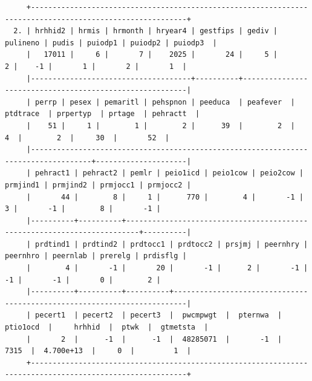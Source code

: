 \documentclass[
]{book}
\begin{document}
\begin{verbatim}
     +----------------------------------------------------------------------------------------------------------+
  2. | hrhhid2 | hrmis | hrmonth | hryear4 | gestfips | gediv | pulineno | pudis | puiodp1 | puiodp2 | puiodp3  |
     |   17011 |     6 |       7 |    2025 |       24 |     5 |        2 |    -1 |       1 |       2 |       1  |
     |-------------------------------------+----------+---------------------------------------------------------|
     | perrp | pesex | pemaritl | pehspnon | peeduca  | peafever  | ptdtrace  | prpertyp  | prtage  | pehractt  |
     |    51 |     1 |        1 |        2 |      39  |        2  |        4  |        2  |     30  |       52  |
     |------------------------------------------------------------------------------------+---------------------|
     | pehract1 | pehract2 | pemlr | peio1icd | peio1cow | peio2cow | prmjind1 | prmjind2 | prmjocc1 | prmjocc2 |
     |       44 |        8 |     1 |      770 |        4 |       -1 |        3 |       -1 |        8 |       -1 |
     |----------+----------+-------------------------------------------------------------------------+----------|
     | prdtind1 | prdtind2 | prdtocc1 | prdtocc2 | prsjmj | peernhry | peernhro | peernlab | prerelg | prdisflg |
     |        4 |       -1 |       20 |       -1 |      2 |       -1 |       -1 |       -1 |       0 |        2 |
     |----------+----------+----------+-------------------------------------------------------------------------|
     | pecert1  | pecert2  | pecert3  |  pwcmpwgt  |  pternwa  |  ptio1ocd  |     hrhhid  |  ptwk  |  gtmetsta  |
     |       2  |      -1  |      -1  |  48285071  |       -1  |      7315  |  4.700e+13  |     0  |         1  |
     +----------------------------------------------------------------------------------------------------------+


\end{verbatim}
\end{document}
